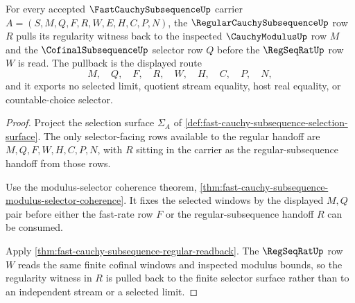 \begin{theorem}
\label{thm:fast-cauchy-subsequence-selector-regularity-pullback}
For every accepted $\FastCauchySubsequenceUp$ carrier $A=(S,M,Q,F,R,W,E,H,C,P,N)$, the $\RegularCauchySubsequenceUp$ row $R$ pulls its regularity witness back to the inspected $\CauchyModulusUp$ row $M$ and the $\CofinalSubsequenceUp$ selector row $Q$ before the $\RegSeqRatUp$ row $W$ is read. The pullback is the displayed route
$$
M,\quad Q,\quad F,\quad R,\quad W,\quad H,\quad C,\quad P,\quad N,
$$
and it exports no selected limit, quotient stream equality, host real equality, or countable-choice selector.
\end{theorem}
\begin{proof}
Project the selection surface $\Sigma_A$ of \autoref{def:fast-cauchy-subsequence-selection-surface}. The only selector-facing rows available to the regular handoff are $M,Q,F,W,H,C,P,N$, with $R$ sitting in the carrier as the regular-subsequence handoff from those rows.

Use the modulus-selector coherence theorem, \autoref{thm:fast-cauchy-subsequence-modulus-selector-coherence}. It fixes the selected windows by the displayed $M,Q$ pair before either the fast-rate row $F$ or the regular-subsequence handoff $R$ can be consumed.

Apply \autoref{thm:fast-cauchy-subsequence-regular-readback}. The $\RegSeqRatUp$ row $W$ reads the same finite cofinal windows and inspected modulus bounds, so the regularity witness in $R$ is pulled back to the finite selector surface rather than to an independent stream or a selected limit.
\end{proof}

